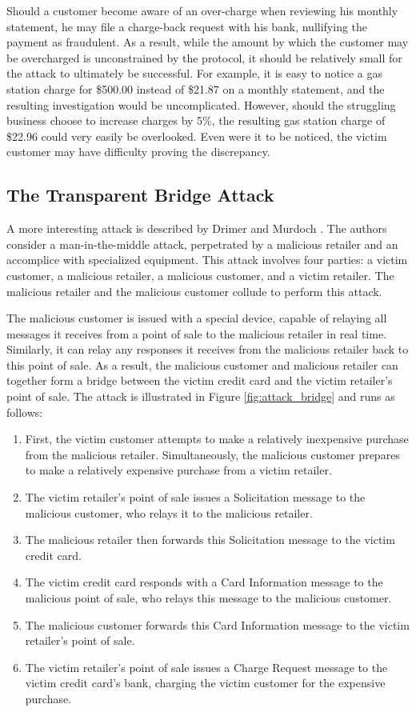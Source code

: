 Should a customer become aware of an over-charge when reviewing his monthly statement, he may file a charge-back request with his bank, nullifying the payment as fraudulent.
As a result, while the amount by which the customer may be overcharged is unconstrained by the protocol, it should be relatively small for the attack to ultimately be successful.
For example, it is easy to notice a gas station charge for \$500.00 instead of \$21.87 on a monthly statement, and the resulting investigation would be uncomplicated.
However, should the struggling business choose to increase charges by 5\%, the resulting gas station charge of \$22.96 could very easily be overlooked.
Even were it to be noticed, the victim customer may have difficulty proving the discrepancy.


\subsection{The Transparent Bridge Attack}
\label{sec:transparent-bridge}
A more interesting attack is described by Drimer and Murdoch \cite{Drimer:2007:KYE:1362903.1362910}.
The authors consider a man-in-the-middle attack, perpetrated by a malicious retailer and an accomplice with specialized equipment.
This attack involves four parties: a victim customer, a malicious retailer, a malicious customer, and a victim retailer.
The malicious retailer and the malicious customer collude to perform this attack.

The malicious customer is issued with a special device, capable of relaying all messages it receives from a point of sale to the malicious retailer in real time.
Similarly, it can relay any responses it receives from the malicious retailer back to this point of sale.
As a result, the malicious customer and malicious retailer can together form a bridge between the victim credit card and the victim retailer's point of sale.
The attack is illustrated in Figure \ref{fig:attack_bridge} and runs as follows:

\begin{enumerate}
\item First, the victim customer attempts to make a relatively inexpensive purchase from the malicious retailer.
Simultaneously, the malicious customer prepares to make a relatively expensive purchase from a victim retailer.
\item The victim retailer's point of sale issues a Solicitation message to the malicious customer, who relays it to the malicious retailer.
\item The malicious retailer then forwards this Solicitation message to the victim credit card.
\item The victim credit card responds with a Card Information message to the malicious point of sale, who relays this message to the malicious customer.
\item The malicious customer forwards this Card Information message to the victim retailer's point of sale.
\item The victim retailer's point of sale issues a Charge Request message to the victim credit card's bank, charging the victim customer for the expensive purchase.
\end{enumerate}

